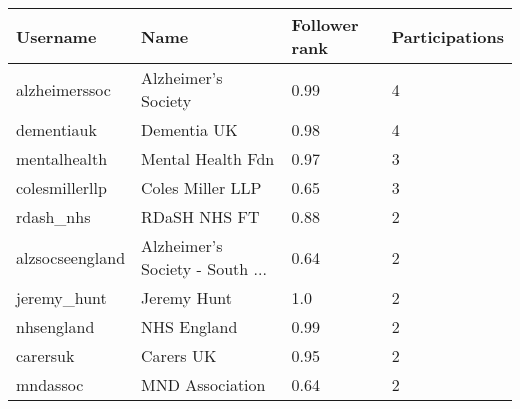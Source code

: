 \begin{tabularx}{\textwidth}{|p{2.5cm}|X|P{2.4cm}|P{2.4cm}|}
\hline
\textbf{Username} & \textbf{Name} & \textbf{Follower rank} & \textbf{Participations} \\ \hline
alzheimerssoc & Alzheimer's Society & 0.99 & 4 \\ \hline
dementiauk & Dementia UK & 0.98 & 4 \\ \hline
mentalhealth & Mental Health Fdn & 0.97 & 3 \\ \hline
colesmillerllp & Coles Miller LLP & 0.65 & 3 \\ \hline
rdash\_nhs & RDaSH NHS FT & 0.88 & 2 \\ \hline
alzsocseengland & Alzheimer's Society - South ... & 0.64 & 2 \\ \hline
jeremy\_hunt & Jeremy Hunt & 1.0 & 2 \\ \hline
nhsengland & NHS England & 0.99 & 2 \\ \hline
carersuk & Carers UK & 0.95 & 2 \\ \hline
mndassoc & MND Association & 0.64 & 2 \\ \hline
\end{tabularx}